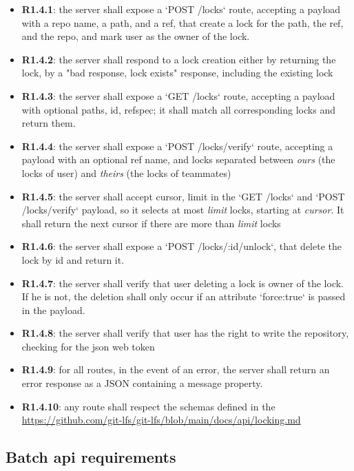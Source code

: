 \begin{itemize}
    \item \textbf{R1.4.1}: the server shall expose a `POST /locks` route, accepting a payload with a repo name, a path, and a ref, that create a lock for the path, the ref, and the repo, and mark user as the owner of the lock.
    \item \textbf{R1.4.2}: the server shall respond to a lock creation either by returning the lock, by a "bad response, lock exists" response, including the existing lock
    \item \textbf{R1.4.3}: the server shall expose a `GET /locks` route, accepting a payload with optional paths, id, refspec; it shall match all corresponding locks and return them.
    \item \textbf{R1.4.4}: the server shall expose a `POST /locks/verify` route, accepting a payload with an optional ref name, and locks separated between \textit{ours} (the locks of user) and \textit{theirs} (the locks of teammates)
    \item \textbf{R1.4.5}: the server shall accept cursor, limit in the `GET /locks` and `POST /locks/verify` payload, so it selects at most \textit{limit} locks, starting at \textit{cursor}. It shall return the next cursor if there are more than \textit{limit} locks
    \item \textbf{R1.4.6}: the server shall expose a `POST /locks/:id/unlock`, that delete the lock by id and return it.
    \item \textbf{R1.4.7}: the server shall verify that user deleting a lock is owner of the lock. If he is not, the deletion shall only occur if an attribute `force:true` is passed in the payload.
    \item \textbf{R1.4.8}: the server shall verify that user has the right to write the repository, checking for the json web token
    \item \textbf{R1.4.9}: for all routes, in the event of an error, the server shall return an error response as a JSON containing a message property.
    \item \textbf{R1.4.10}: any route shall respect the schemas defined in the \url{https://github.com/git-lfs/git-lfs/blob/main/docs/api/locking.md}
\end{itemize}

\subsection{Batch api requirements}

